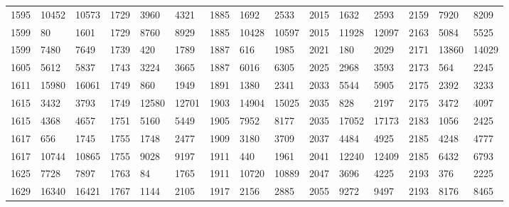 \begin{longtable}{*4{A@{\hspace*{5mm}}A}}
	1595&10452&10573&1729&3960&4321&1885&1692&2533&2015&1632&2593&2159&7920&8209\\
	1599&80&1601&1729&8760&8929&1885&10428&10597&2015&11928&12097&2163&5084&5525\\
	1599&7480&7649&1739&420&1789&1887&616&1985&2021&180&2029&2171&13860&14029\\
	1605&5612&5837&1743&3224&3665&1887&6016&6305&2025&2968&3593&2173&564&2245\\
	1611&15980&16061&1749&860&1949&1891&1380&2341&2033&5544&5905&2175&2392&3233\\
	1615&3432&3793&1749&12580&12701&1903&14904&15025&2035&828&2197&2175&3472&4097\\
	1615&4368&4657&1751&5160&5449&1905&7952&8177&2035&17052&17173&2183&1056&2425\\
	1617&656&1745&1755&1748&2477&1909&3180&3709&2037&4484&4925&2185&4248&4777\\
	1617&10744&10865&1755&9028&9197&1911&440&1961&2041&12240&12409&2185&6432&6793\\
	1625&7728&7897&1763&84&1765&1911&10720&10889&2047&3696&4225&2193&376&2225\\
	1629&16340&16421&1767&1144&2105&1917&2156&2885&2055&9272&9497&2193&8176&8465\\
	
	
	
\end{longtable}